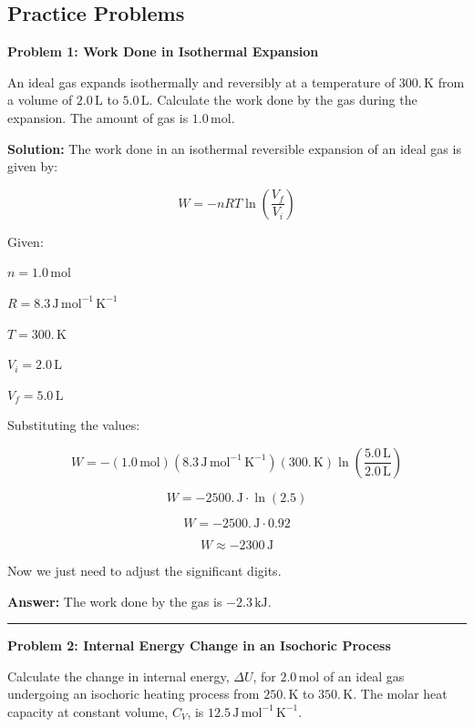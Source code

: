 \documentclass[
  9pt,
]{extbook}
\theoremstyle{definition}
\theoremstyle{definition}
\theoremstyle{definition}
\theoremstyle{definition}
\theoremstyle{remark}
\begin{document}
\subsection{Practice Problems}\label{exer3}

\textbf{Problem 1: Work Done in Isothermal Expansion}

An ideal gas expands isothermally and reversibly at a temperature of \(300. \, \text{K}\) from a volume of \(2.0 \, \text{L}\) to \(5.0 \, \text{L}\). Calculate the work done by the gas during the expansion. The amount of gas is \(1.0 \, \text{mol}\).

\textbf{Solution:} The work done in an isothermal reversible expansion of an ideal gas is given by:

\[ W = -nRT \ln \left(\frac{V_f}{V_i}\right) \]

Given:

\(n = 1.0 \, \text{mol}\)

\(R = 8.3 \, \text{J} \, \text{mol}^{-1} \, \text{K}^{-1}\)

\(T = 300. \, \text{K}\)

\(V_i = 2.0 \, \text{L}\)

\(V_f = 5.0 \, \text{L}\)

Substituting the values:

\[ W = - (1.0\, \text{mol}) (8.3 \, \text{J} \, \text{mol}^{-1} \, \text{K}^{-1}) (300. \, \text{K})  \ln \left(\frac{5.0\, \text{L}}{2.0\, \text{L}}\right) \]

\[ W = -2500.\, \text{J} \cdot \ln \left(2.5\right) \]

\[ W = -2500.\, \text{J} \cdot 0.92 \]

\[ W \approx -2300 \, \text{J} \]

Now we just need to adjust the significant digits.

\textbf{Answer:} The work done by the gas is \(-2.3 \, \text{kJ}\).

\begin{center}\rule{0.5\linewidth}{0.5pt}\end{center}

\textbf{Problem 2: Internal Energy Change in an Isochoric Process}

Calculate the change in internal energy, \(\Delta U\), for \(2.0 \, \text{mol}\) of an ideal gas undergoing an isochoric heating process from \(250. \, \text{K}\) to \(350. \, \text{K}\). The molar heat capacity at constant volume, \(C_V\), is \(12.5 \, \text{J} \, \text{mol}^{-1} \, \text{K}^{-1}\).
\end{document}
